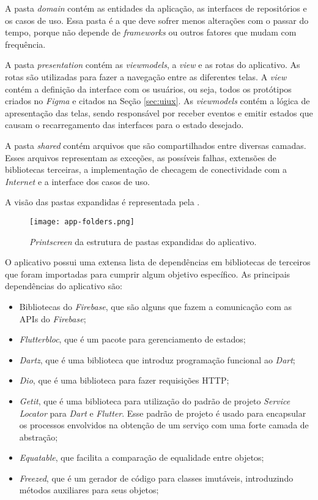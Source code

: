 A pasta \textit{domain} contém as entidades da aplicação, as interfaces de repositórios e os casos de uso. Essa pasta é a que deve sofrer menos alterações com o passar do tempo, porque não depende de \textit{frameworks} ou outros fatores que mudam com frequência.

A pasta \textit{presentation} contém as \textit{viewmodels}, a \textit{view} e as rotas do aplicativo. As rotas são utilizadas para fazer a navegação entre as diferentes telas. A \textit{view} contém a definição da interface com os usuários, ou seja, todos os protótipos criados no \textit{Figma} e citados na Seção \ref{sec:uiux}. As \textit{viewmodels} contém a lógica de apresentação das telas, sendo responsável por receber eventos e emitir estados que causam o recarregamento das interfaces para o estado desejado.

A pasta \textit{shared} contém arquivos que são compartilhados entre diversas camadas. Esses arquivos representam as exceções, as possíveis falhas, extensões de bibliotecas terceiras, a implementação de checagem de conectividade com a \textit{Internet} e a interface dos casos de uso.

A visão das pastas expandidas é representada pela .

\begin{figure}[!htb]
  \centering
  \texttt{[image: app-folders.png]}
  \caption{\textit{Printscreen} da estrutura de pastas expandidas do aplicativo.}
  \label{fig:folders}
\end{figure}

O aplicativo possui uma extensa lista de dependências em bibliotecas de terceiros que foram importadas para cumprir algum objetivo específico. As principais dependências do aplicativo são:

\begin{itemize}
  \item Bibliotecas do \textit{Firebase}, que são alguns  que fazem a comunicação com as APIs do \textit{Firebase};
  \item \textit{Flutter\underline{\space}bloc}, que é um pacote para gerenciamento de estados;
  \item \textit{Dartz}, que é uma biblioteca que introduz programação funcional ao \textit{Dart};
  \item \textit{Dio}, que é uma biblioteca para fazer requisições HTTP;
  \item \textit{Get\underline{\space}it}, que é uma biblioteca para utilização do padrão de projeto \textit{Service Locator} para \textit{Dart} e \textit{Flutter}. Esse padrão de projeto é usado para encapsular os processos envolvidos na obtenção de um serviço com uma forte camada de abstração;
  \item \textit{Equatable}, que facilita a comparação de equalidade entre objetos;
  \item \textit{Freezed}, que é um gerador de código para classes imutáveis, introduzindo métodos auxiliares para seus objetos;
\end{itemize}
